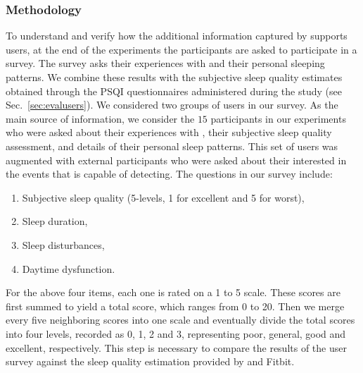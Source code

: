 \subsubsection{Methodology}
To understand and verify how the additional information captured by {\systemname} supports users, at the end of the experiments the
participants are asked to participate in a survey. The survey asks their experiences with {\systemname} and their personal sleeping
patterns. We combine these results with the subjective sleep quality estimates obtained through the PSQI questionnaires administered during
the study (see Sec.~\ref{sec:evalusers}). We considered two groups of users in our survey. As the main source of information, we consider
the $15$ participants in our experiments who were asked about their experiences with {\systemname}, their subjective sleep quality
assessment, and details of their personal sleep patterns. This set of users was augmented with external participants who were asked about
their interested in the events that {\systemname} is capable of detecting. The questions in our survey include:
\begin{enumerate}
  \item Subjective sleep quality (5-levels, 1 for excellent and 5 for worst),
  \item Sleep duration,
  \item Sleep disturbances,
  \item Daytime dysfunction.
\end{enumerate}
For the above four items, each one is rated on a 1 to 5 scale. These scores are first summed to yield a total score, which ranges from 0 to 20. Then we merge every five neighboring scores into one scale and eventually divide the total scores into four levels, recorded as 0, 1, 2 and 3, representing poor, general, good and excellent, respectively. This step is necessary to compare the results of the user survey against the sleep quality estimation provided by {\systemname} and Fitbit.


